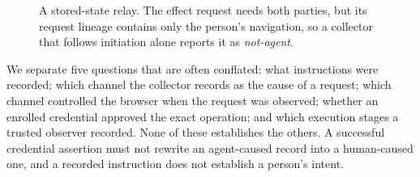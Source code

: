 \documentclass[11pt]{article}
\theoremstyle{definition}
\begin{document}
\begin{figure}[tb]
\centering
{}
\caption{A stored-state relay. The effect request needs both parties, but its
request lineage contains only the person's navigation, so a collector that
follows initiation alone reports it as \emph{not-agent}.}
\label{fig:relay}
\end{figure}

We separate five questions that are often conflated: what instructions were
recorded; which channel the collector records as the cause of a request; which
channel controlled the browser when the request was observed; whether an enrolled
credential approved the exact operation; and which execution stages a trusted
observer recorded. None of these establishes the others. A successful credential
assertion must not rewrite an agent-caused record into a human-caused one, and a
recorded instruction does not establish a person's intent.
\end{document}
